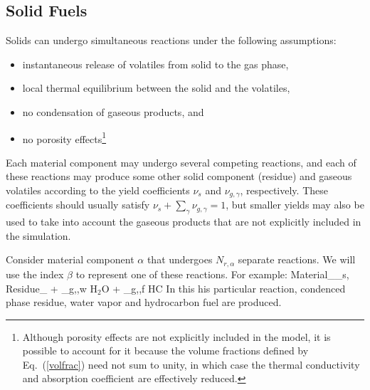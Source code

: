 \subsection{Solid Fuels}

Solids can undergo simultaneous reactions under the following assumptions:
\begin{itemize}
\setlength{\itemsep}{0.0in}
\item instantaneous release of volatiles from solid to the gas phase,
\item local thermal equilibrium between the solid and the volatiles,
\item no condensation of gaseous products, and
\item no porosity effects\footnote{Although porosity effects are not explicitly included in the model, it is possible to account for it
because the volume fractions defined by Eq.~(\ref{volfrac}) need not
sum to unity, in which case the thermal conductivity and absorption
coefficient are effectively reduced.}
\end{itemize}
Each material component may undergo several competing reactions, and
each of these reactions may produce some other solid component
(residue) and gaseous volatiles according to the yield coefficients
$\nu_s$ and $\nu_{g,\gamma}$, respectively.  These coefficients should
usually satisfy $\nu_s + \sum_\gamma \nu_{g,\gamma} = 1$, but smaller yields may
also be used to take into account the gaseous products that are not
explicitly included in the simulation.

Consider material component $\alpha$ that undergoes $N_{r,\alpha}$ separate reactions. We will use the index $\beta$ to represent one of
these reactions. For example:
\be \hbox{Material}_\alpha \rightarrow \nu_{s,\alpha \beta} \;
    \hbox{Residue}_{\alpha \beta} + \nu_{g,\alpha \beta,w} \; \hbox{H$_2$O} + \nu_{g,\alpha \beta,f} \; \hbox{HC} \ee
In this his particular reaction, condenced phase residue, water vapor
and hydrocarbon fuel are produced.

